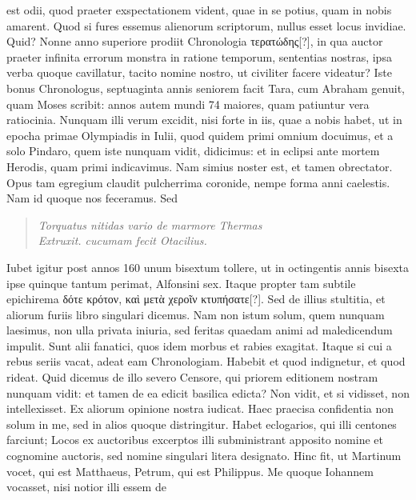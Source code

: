 est odii, quod praeter exspectationem vident, quae in se potius, quam
in nobis amarent.
Quod si fures essemus alienorum scriptorum, nullus
esset locus invidiae.
Quid?
Nonne anno superiore prodiit Chronologia
\textgreek{τερατώδης[?]}, in qua auctor praeter infinita errorum monstra
in ratione temporum, sententias nostras, ipsa verba quoque cavillatur,
tacito nomine nostro, ut civiliter facere videatur?
%
Iste bonus
Chronologus, septuaginta annis seniorem facit Tara, cum Abraham
genuit, quam Moses scribit: annos autem mundi 74 maiores,
quam patiuntur vera ratiocinia.
Nunquam illi verum excidit, nisi
forte in iis, quae a nobis habet, ut in epocha primae Olympiadis in
 Iulii, quod quidem primi omnium docuimus, et a solo
Pindaro, quem iste nunquam vidit, didicimus: et in eclipsi ante
mortem Herodis, quam primi indicavimus.
Nam simius noster est,
et tamen obrectator.
Opus tam egregium claudit pulcherrima
coronide, nempe forma anni caelestis.
Nam id quoque nos feceramus.
Sed
\begin{verse}
  \textit{Torquatus nitidas vario de marmore Thermas}\\
  \textit{Extruxit. cucumam fecit Otacilius.}
\end{verse}
Iubet igitur post annos 160 unum bisextum tollere, ut in octingentis
annis bisexta ipse quinque tantum perimat, Alfonsini sex.
Itaque propter tam subtile epichirema
 \textgreek{δότε κρότον, καὶ μετὰ χεροῖν κτυπήσατε[?]}.
Sed de illius stultitia, et aliorum furiis libro singulari dicemus.
Nam non istum solum, quem nunquam laesimus, non ulla privata iniuria,
sed feritas quaedam animi ad maledicendum impulit.
Sunt alii
fanatici, quos idem morbus et rabies exagitat.
Itaque si cui a rebus
seriis vacat, adeat eam Chronologiam.
Habebit et quod indignetur,
et quod rideat.
Quid dicemus de illo severo Censore, qui priorem
editionem nostram nunquam vidit: et tamen de ea edicit basilica
edicta?
Non vidit, et si vidisset, non intellexisset.
Ex aliorum opinione
nostra iudicat.
Haec praecisa confidentia non solum in me,
sed in alios quoque distringitur.
Habet eclogarios, qui illi centones
farciunt;
Locos ex auctoribus excerptos illi subministrant apposito
nomine et cognomine auctoris, sed nomine singulari litera designato.
Hinc fit, ut Martinum vocet, qui est Matthaeus, Petrum, qui est
Philippus.
Me quoque Iohannem vocasset, nisi notior illi essem de
